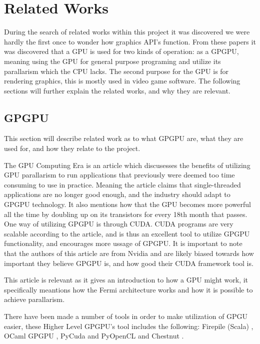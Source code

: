 \section{Related Works}\label{sec:problem_statement}
During the search of related works within this project it was discovered we were hardly the first once to wonder how graphics \gls{API}'s function. From these papers it was discovered that a \gls{GPU} is used for two kinds of operation: as a GP\gls{GPU}, meaning using the \gls{GPU} for general purpose programing and utilize its parallarism which the CPU lacks. 
The second purpose for the \gls{GPU} is for rendering graphics, this is mostly used in video game software. The following sections will further explain the related works, and why they are relevant.

\subsection{GP\gls{GPU}}
This section will describe related work as to what GP\gls{GPU} are, what they are used for, and how they relate to the project.

The GPU Computing Era \cite{gpu_computing_era} is an article which discusesses the benefits of utilizing \gls{GPU} parallarism to run applications that previously were deemed too time consuming to use in practice. 
Meaning the article claims that single-threaded applications are no longer good enough, and the industry should adapt to GP\gls{GPU} technology. 
It also mentions how that the \gls{GPU} becomes more powerful all the time by doubling up on its transistors for every 18th month that passes. 
One way of utilizing GP\gls{GPU} is through CUDA.
CUDA programs are very scalable according to the article, and is thus an excellent tool to utilize GP\gls{GPU} functionality, and encourages more ussage of GP\gls{GPU}. It is important to note that the authors of this article are from Nvidia and are likely biased towards how important they believe GP\gls{GPU} is, and how good their CUDA framework tool is. 

This article is relevant as it gives an introduction to how a \gls{GPU} might work, it specifically meantions how the Fermi architecture works and how it is possible to achieve parallarism.

There have been made a number of tools in order to make utilization of GPGU easier, these Higher Level GP\gls{GPU}'s tool includes the following: Firepile (Scala) \cite{2011_firepile}, OCaml GP\gls{GPU} \cite{bourgoin_2017_high}, PyCuda and PyOpenCL \cite{2012_pycuda_pyopencl} and Chestnut \cite{stromme_2012_chestnut}.

